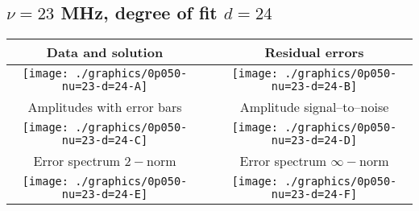 

% 

\clearpage{}
\break{}

\subsection{$\nu = 23$ MHz, degree of fit $d = 24$}

\begin{table}[h]
    \begin{center}
        \begin{tabular}{ccc}
            Data and solution & \quad & Residual errors \\\hline
            \texttt{[image: ./graphics/0p050-nu=23-d=24-A]} &&
            \texttt{[image: ./graphics/0p050-nu=23-d=24-B]} \\[15pt]
            Amplitudes with error bars && Amplitude signal--to--noise \\\hline
            \texttt{[image: ./graphics/0p050-nu=23-d=24-C]} &&
            \texttt{[image: ./graphics/0p050-nu=23-d=24-D]} \\[15pt]
            Error spectrum $2-$norm && Error spectrum $\infty-$norm \\\hline
            \texttt{[image: ./graphics/0p050-nu=23-d=24-E]} &&
            \texttt{[image: ./graphics/0p050-nu=23-d=24-F]} \\[15pt]
        \end{tabular}
    \end{center}
\label{fig:elev=50, nu=23}
\end{table}



\endinput
